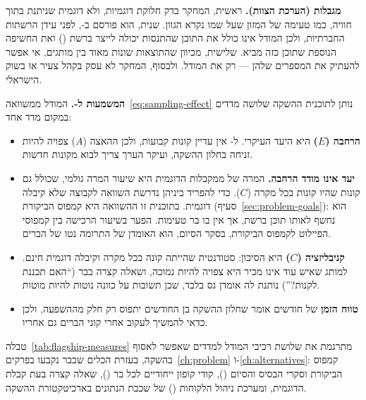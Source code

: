 \textbf{מגבלות (הערכת הצוות).} ראשית, המחקר בדק חלוקת דוגמיות, ולא דוגמית
שניתנת בתוך חוויה, כמו טעימה של המזון שעל שמו נקרא הגוון. שנית, הוא פורסם
ב-, לפני עידן הרשתות החברתיות, ולכן המודל אינו כולל את התוכן שהתנסות
יכולה לייצר ברשת () ואת החשיפה הנוספת שתוכן כזה מביא. שלישית, מכיוון
שהתוצאות שונות מאוד בין מותגים, אי אפשר להעתיק את המספרים שלהן --- רק את המודל.
ולבסוף, המחקר לא עסק בקהל צעיר או בשוק הישראלי.

\textbf{המשמעות ל-.} המודל ממשוואה~\eqref{eq:sampling-effect} נותן
לתוכנית ההשקה שלושה מדדים במקום מדד אחד:
\begin{itemize}
  \item \textbf{הרחבה ($E$)} היא היעד העיקרי. ל- אין עדיין קונות קבועות,
    ולכן ההאצה ($A$) צפויה להיות זניחה בחלון ההשקה, ועיקר הערך צריך לבוא מקונות
    חדשות.
  \item \textbf{יעד  אינו מודד הרחבה.} המרה של  ממקבלות הדוגמית
    היא שיעור המרה גולמי, שכולל גם קונות שהיו קונות בכל מקרה ($C$). כדי להפריד
    ביניהן נדרשת השוואה לקבוצה שלא קיבלה דוגמית. בתוכנית זו ההשוואה היא
    קמפוס הביקורת (סעיף~\ref{sec:problem-goals}): הוא נחשף לאותו תוכן ברשת, אך
    אין בו בר טעימות. הפער בשיעור הרכישה בין קמפוסי הפיילוט לקמפוס הביקורת,
    בסקר הסיום, הוא האומדן של התרומה נטו של הברים.
  \item \textbf{קניבליזציה ($C$)} היא הסיכון: סטודנטית שהייתה קונה בכל מקרה
    וקיבלה דוגמית חינם. למותג שאיש עוד אינו מכיר היא צפויה להיות נמוכה, ושאלה
    קצרה בבר (``האם תכננת לקנות?'') נותנת לה אומדן גס בלבד, שכן תשובות על כוונה
    נוטות להיות מוטות.
  \item \textbf{טווח הזמן} של  חודשים אומר שחלון ההשקה בן  החודשים
    יתפוס רק חלק מההשפעה, ולכן כדאי להמשיך לעקוב אחרי קוני הברים גם אחריו.
\end{itemize}

טבלה~\ref{tab:flagship-measures} מתרגמת את שלושת רכיבי המודל למדדים שאפשר לאסוף
בהשקה, בעזרת הכלים שכבר נקבעו בפרקים~\ref{ch:problem} ו-\ref{ch:alternatives}:
קמפוס הביקורת וסקרי הבסיס והסיום (), קודי קופון ייחודיים לכל בר
(), שאלה קצרה בעת קבלת הדוגמית, ומערכת ניהול הלקוחות () של
שכבת הנתונים בארכיטקטורת ההשקה.


